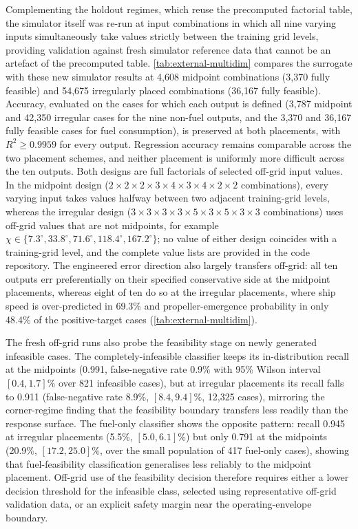 \documentclass[final,5p,times,twocolumn,numbers]{elsarticle}
\begin{document}
Complementing the holdout regimes, which reuse the precomputed factorial table, the simulator itself was re-run at input combinations in which all nine varying inputs simultaneously take values strictly between the training grid levels, providing validation against fresh simulator reference data that cannot be an artefact of the precomputed table. \autoref{tab:external-multidim} compares the surrogate with these new simulator results at 4{,}608 midpoint combinations (3{,}370 fully feasible) and 54{,}675 irregularly placed combinations (36{,}167 fully feasible). Accuracy, evaluated on the cases for which each output is defined (3{,}787 midpoint and 42{,}350 irregular cases for the nine non-fuel outputs, and the 3{,}370 and 36{,}167 fully feasible cases for fuel consumption), is preserved at both placements, with $R^2\geq0.9959$ for every output. Regression accuracy remains comparable across the two placement schemes, and neither placement is uniformly more difficult across the ten outputs. Both designs are full factorials of selected off-grid input values. In the midpoint design ($2\times2\times2\times3\times4\times3\times4\times2\times2$ combinations), every varying input takes values halfway between two adjacent training-grid levels, whereas the irregular design ($3\times3\times3\times3\times5\times3\times5\times3\times3$ combinations) uses off-grid values that are not midpoints, for example $\chi\in\{7.3^\circ,33.8^\circ,71.6^\circ,118.4^\circ,167.2^\circ\}$; no value of either design coincides with a training-grid level, and the complete value lists are provided in the code repository. The engineered error direction also largely transfers off-grid: all ten outputs err preferentially on their specified conservative side at the midpoint placements, whereas eight of ten do so at the irregular placements, where ship speed is over-predicted in 69.3\% and propeller-emergence probability in only 48.4\% of the positive-target cases (\autoref{tab:external-multidim}).

The fresh off-grid runs also probe the feasibility stage on newly generated infeasible cases. The completely-infeasible classifier keeps its in-distribution recall at the midpoints (0.991, false-negative rate 0.9\% with 95\% Wilson interval $[0.4, 1.7]\%$ over 821 infeasible cases), but at irregular placements its recall falls to 0.911 (false-negative rate 8.9\%, $[8.4, 9.4]\%$, 12{,}325 cases), mirroring the corner-regime finding that the feasibility boundary transfers less readily than the response surface. The fuel-only classifier shows the opposite pattern: recall 0.945 at irregular placements (5.5\%, $[5.0, 6.1]\%$) but only 0.791 at the midpoints (20.9\%, $[17.2, 25.0]\%$, over the small population of 417 fuel-only cases), showing that fuel-feasibility classification generalises less reliably to the midpoint placement. Off-grid use of the feasibility decision therefore requires either a lower decision threshold for the infeasible class, selected using representative off-grid validation data, or an explicit safety margin near the operating-envelope boundary.
\end{document}
